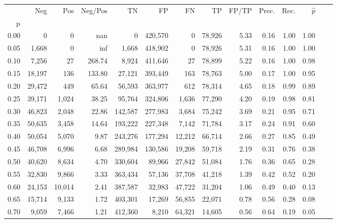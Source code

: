 \begin{tabular}{rrrrrrrrrrrrrr}
\toprule
{} &     Neg &     Pos & Neg/Pos &       TN &       FP &      FN &      TP & FP/TP & Prec. &  Rec. & $\hat{p}$ \\
p    &         &         &         &          &          &         &         &       &       &       &           \\
\midrule
0.00 &       0 &       0 &     nan &        0 &  420,570 &       0 &  78,926 &  5.33 &  0.16 &  1.00 &      1.00 \\
0.05 &   1,668 &       0 &     inf &    1,668 &  418,902 &       0 &  78,926 &  5.31 &  0.16 &  1.00 &      1.00 \\
0.10 &   7,256 &      27 &  268.74 &    8,924 &  411,646 &      27 &  78,899 &  5.22 &  0.16 &  1.00 &      0.98 \\
0.15 &  18,197 &     136 &  133.80 &   27,121 &  393,449 &     163 &  78,763 &  5.00 &  0.17 &  1.00 &      0.95 \\
0.20 &  29,472 &     449 &   65.64 &   56,593 &  363,977 &     612 &  78,314 &  4.65 &  0.18 &  0.99 &      0.89 \\
0.25 &  39,171 &   1,024 &   38.25 &   95,764 &  324,806 &   1,636 &  77,290 &  4.20 &  0.19 &  0.98 &      0.81 \\
0.30 &  46,823 &   2,048 &   22.86 &  142,587 &  277,983 &   3,684 &  75,242 &  3.69 &  0.21 &  0.95 &      0.71 \\
0.35 &  50,635 &   3,458 &   14.64 &  193,222 &  227,348 &   7,142 &  71,784 &  3.17 &  0.24 &  0.91 &      0.60 \\
0.40 &  50,054 &   5,070 &    9.87 &  243,276 &  177,294 &  12,212 &  66,714 &  2.66 &  0.27 &  0.85 &      0.49 \\
0.45 &  46,708 &   6,996 &    6.68 &  289,984 &  130,586 &  19,208 &  59,718 &  2.19 &  0.31 &  0.76 &      0.38 \\
0.50 &  40,620 &   8,634 &    4.70 &  330,604 &   89,966 &  27,842 &  51,084 &  1.76 &  0.36 &  0.65 &      0.28 \\
0.55 &  32,830 &   9,866 &    3.33 &  363,434 &   57,136 &  37,708 &  41,218 &  1.39 &  0.42 &  0.52 &      0.20 \\
0.60 &  24,153 &  10,014 &    2.41 &  387,587 &   32,983 &  47,722 &  31,204 &  1.06 &  0.49 &  0.40 &      0.13 \\
0.65 &  15,714 &   9,133 &    1.72 &  403,301 &   17,269 &  56,855 &  22,071 &  0.78 &  0.56 &  0.28 &      0.08 \\
0.70 &   9,059 &   7,466 &    1.21 &  412,360 &    8,210 &  64,321 &  14,605 &  0.56 &  0.64 &  0.19 &      0.05 \\

\end{tabular}
